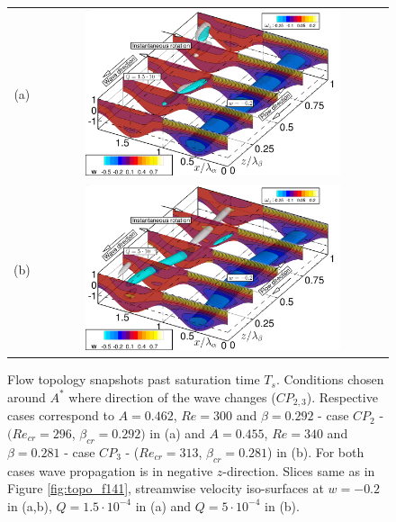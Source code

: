 \documentclass[lineno]{jfm}
\begin{document}
\begin{figure}
\centering
\begin{tabular}{cc}
    (a) & \includegraphics[width=0.75\textwidth]{f0924.png} \\
    (b) & \includegraphics[width=0.75\textwidth]{f092.png} \\
\end{tabular}
\caption{Flow topology snapshots past saturation time $T_s$. Conditions chosen around $A^*$ where direction of the wave changes ($CP_{2,3}$). Respective cases correspond to $A=0.462$, $Re=300$ and $\beta=0.292$ - case $CP_2$ - $(Re_{cr}=296$, $\beta_{cr}=0.292)$ in (a)
and
$A=0.455$, $Re=340$ and $\beta=0.281$ - case $CP_3$ - ($Re_{cr}=313$, $\beta_{cr}=0.281$) in (b).
For both cases wave propagation is in negative $z$-direction.
Slices same as in Figure \ref{fig:topo_f141},
streamwise velocity iso-surfaces at $w=-0.2$ in (a,b), $Q=1.5\cdot10^{-4}$ in (a)
and $Q=5\cdot10^{-4}$ in (b).}
\label{fig:topo_f0924}
\end{figure}
\end{document}
